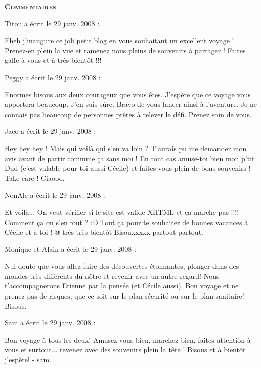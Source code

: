 \bigskip
\textbf{\textsc{Commentaires}}

\medskip
Titou a écrit le 29 janv. 2008 :
\begin{displayquote}
Eheh j'inaugure ce joli petit blog en vous souhaitant un excellent voyage ! Prenez-en plein la vue et ramenez nous pleins de souvenirs à partager ! Faites gaffe à vous et à très bientôt !!!
\end{displayquote}

\medskip
Peggy a écrit le 29 janv. 2008 :
\begin{displayquote}
Enormes bisous aux deux courageux que vous êtes. J'espère que ce voyage vous apportera beaucoup. J'en suis sûre. Bravo de vous lancer ainsi à l'aventure. Je ne connais pas beaucoup de personnes prêtes à relever le défi. Prenez soin de vous.
\end{displayquote}

\medskip
Jaco a écrit le 29 janv. 2008 :
\begin{displayquote}
Hey hey hey !
Mais qui voilà qui s'en va loin ? T'aurais pu me demander mon avis avant de partir commme ça sans moi !
En tout cas amuse-toi bien mon p'tit Dud (c'est valable pour toi aussi Cécile) et faites-vous plein de bons souvenirs !
Take care !
Ciaooo.
\end{displayquote}

\medskip
NonAle a écrit le 29 janv. 2008 :
\begin{displayquote}
Et voilà... On veut vérifier si le site est valide XHTML et ça marche pas !!!! Comment ça on s'en fout ? :D
Tout ça pour te souhaiter de bonnes vacances à Cécile et à toi !
@ très très bientôt
Bisouxxxxx partout partout.
\end{displayquote}

\medskip
Monique et Alain a écrit le 29 janv. 2008 :
\begin{displayquote}
Nul doute que vous allez faire des découvertes étonnantes, plonger dans des mondes très différents du nôtre et revenir avec un autre regard! Nous t'accompagnerons Etienne par la pensée (et Cécile aussi). Bon voyage et ne prenez pas de risques, que ce soit sur le plan sécurité ou sur le plan sanitaire!
Bisous.
\end{displayquote}

\medskip
Sam a écrit le 29 janv. 2008 :
\begin{displayquote}
Bon voyage à tous les deux!
Amusez vous bien, marchez bien, faites attention à vous et surtout... revenez avec des souvenirs plein la tête !
Bisous et à bientôt j'espère!
- sam.
\end{displayquote}

